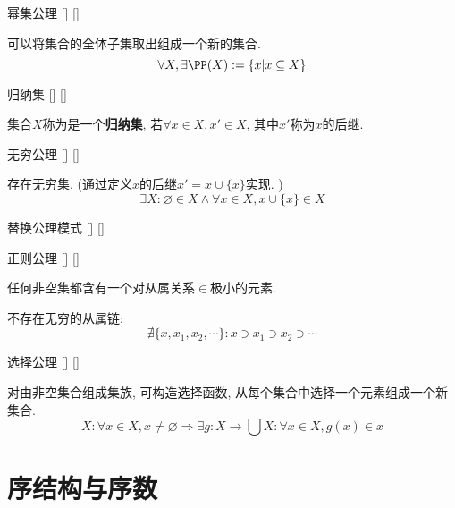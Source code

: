 \documentclass[UTF8]{ctexart}
\begin{document}
    \begin{axm}
        []
        {幂集公理}
        []
        []


        可以将集合的全体子集取出组成一个新的集合. 
        \[\forall X, \exists\PP(X):=\{x|x\subseteq X\}\]
    \end{axm}
    
    \begin{dfn}
        []
        {归纳集}
        []
        []


        集合$X$称为是一个\textbf{归纳集}, 若$\forall x\in X, x'\in X$, 其中$x'$称为$x$的后继. 
    \end{dfn}
    
    \begin{axm}
        []
        {无穷公理}
        []
        []

        
        存在无穷集. (通过定义$x$的后继$x'=x\cup\{x\}$实现. )
        \[\exists X: \varnothing\in X\wedge\forall x\in X, x\cup\{x\}\in X\]
    \end{axm}
    
    \begin{axm}
        []
        {替换公理模式}
        []
        []

    \end{axm}
    
    \begin{axm}
        []
        {正则公理}
        []
        []


        任何非空集都含有一个对从属关系$\in$极小的元素. 
    \end{axm}
    
    \begin{thm}
        {}
        不存在无穷的从属链: 
        \[\nexists \{x,x_1,x_2,\cdots\}: x\ni x_1\ni x_2\ni \cdots\]
    \end{thm}
    
    \begin{axm}
        []
        {选择公理}
        []
        []


        对由非空集合组成集族, 可构造选择函数, 从每个集合中选择一个元素组成一个新集合. 
        \[X: \forall x\in X, x\neq\varnothing\Longrightarrow\exists g:X\to\bigcup X: \forall x\in X, g(x)\in x\]
    \end{axm}

\section{序结构与序数}
\end{document}
